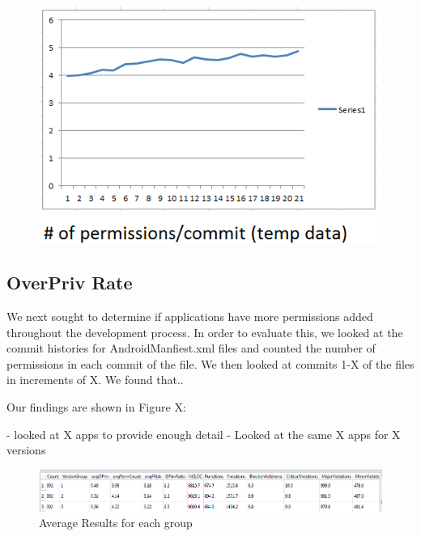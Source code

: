 \documentclass{sig-alternate}
\begin{document}
\begin{figure}[ht!]
\centering
\includegraphics[width=120mm,scale=.3]{images/temp_permissionCountPerCommit.png}
\end{figure}




\subsection{OverPriv Rate}





We next sought to determine if applications have more permissions added throughout the development process. In order to evaluate this, we looked at the commit histories for AndroidManfiest.xml files and counted the number of permissions in each commit of the file. We then looked at commits 1-X of the files in increments of X. We found that..


Our findings are shown in Figure X:



- looked at X apps to provide enough detail
- Looked at the same X apps for X versions




\begin{figure}[ht!]
\centering
\includegraphics[width=180mm,scale=1.0]{images/temp_AverageResults.png}
\caption{Average Results for each group}
\end{figure}
\end{document}
